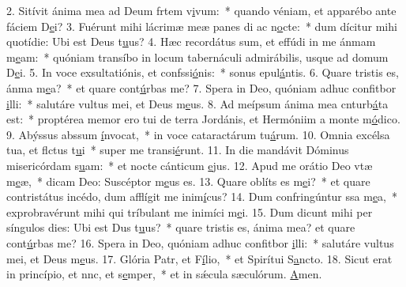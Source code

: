 2. Sitívit ánima mea ad Deum frtem v\uline{i}vum:~* quando véniam, et apparébo ante fáciem D\uline{e}i?
3. Fuérunt mihi lácrimæ meæ panes di ac n\uline{o}cte:~* dum dícitur mihi quotídie: Ubi est Deus t\uline{u}us?
4. Hæc recordátus sum, et effúdi in me ánmam m\uline{e}am:~* quóniam transíbo in locum tabernáculi admirábilis, usque ad domum D\uline{e}i.
5. In voce exsultatiónis, et confssi\uline{ó}nis:~* sonus epul\uline{á}ntis.
6. Quare tristis es, ánma m\uline{e}a?~* et quare cont\uline{ú}rbas me?
7. Spera in Deo, quóniam adhuc confitbor \uline{i}lli:~* salutáre vultus mei, et Deus m\uline{e}us.
8. Ad meípsum ánima mea cnturb\uline{á}ta est:~* proptérea memor ero tui de terra Jordánis, et Hermóniim a monte m\uline{ó}dico.
9. Abýssus abssum \uline{í}nvocat,~* in voce cataractárum tu\uline{á}rum.
10. Omnia excélsa tua, et flctus t\uline{u}i~* super me transi\uline{é}runt.
11. In die mandávit Dóminus misericórdam s\uline{u}am:~* et nocte cánticum \uline{e}jus.
12. Apud me orátio Deo vtæ m\uline{e}æ,~* dicam Deo: Suscéptor m\uline{e}us es.
13. Quare oblíts es m\uline{e}i?~* et quare contristátus incédo, dum afflígit me inim\uline{í}cus?
14. Dum confringúntur ssa m\uline{e}a,~* exprobravérunt mihi qui tríbulant me inimíci m\uline{e}i.
15. Dum dicunt mihi per síngulos dies: Ubi est Dus t\uline{u}us?~* quare tristis es, ánima mea? et quare cont\uline{ú}rbas me?
16. Spera in Deo, quóniam adhuc confitbor \uline{i}lli:~* salutáre vultus mei, et Deus m\uline{e}us.
17. Glória Patr, et F\uline{í}lio,~* et Spirítui S\uline{a}ncto.
18. Sicut erat in princípio, et nnc, et s\uline{e}mper,~* et in sǽcula sæculórum. \uline{A}men.
